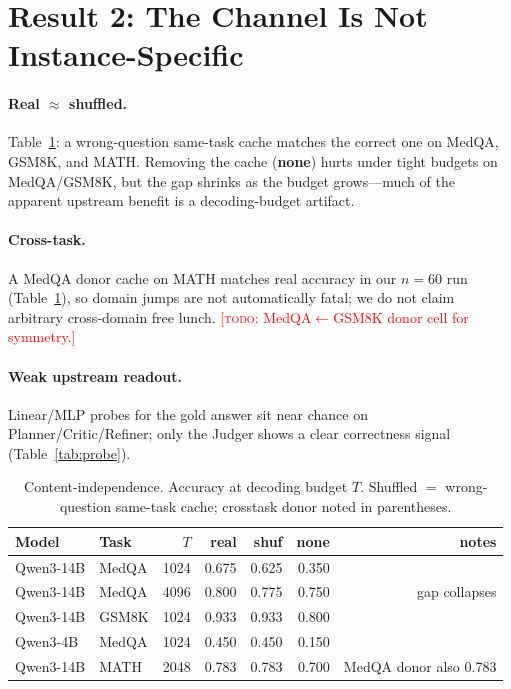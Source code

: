 \documentclass[11pt]{article}
\newcommand{\todo}[1]{\textcolor{red}{[\textsc{todo}: #1]}}
\newcommand{\approxeqq}{\ensuremath{\approx}}
\begin{document}
\section{Result 2: The Channel Is Not Instance-Specific}
\label{sec:mechanism}
\paragraph{Real $\approxeqq$ shuffled.} Table~\ref{tab:swap}: a wrong-question
same-task cache matches the correct one on MedQA, GSM8K, and MATH. Removing the
cache (\textbf{none}) hurts under tight budgets on MedQA/GSM8K, but the gap
shrinks as the budget grows---much of the apparent upstream benefit is a
decoding-budget artifact.

\paragraph{Cross-task.} A MedQA donor cache on MATH matches real accuracy in our
$n{=}60$ run (Table~\ref{tab:swap}), so domain jumps are not automatically fatal;
we do not claim arbitrary cross-domain free lunch. \todo{MedQA$\leftarrow$GSM8K
donor cell for symmetry.}

\paragraph{Weak upstream readout.} Linear/MLP probes for the gold answer sit near
chance on Planner/Critic/Refiner; only the Judger shows a clear correctness
signal (Table~\ref{tab:probe}).

\begin{table}[t]
\centering\small
\caption{Content-independence. Accuracy at decoding budget $T$. Shuffled $=$
wrong-question same-task cache; crosstask donor noted in parentheses.}
\label{tab:swap}
\begin{tabular}{@{}llrrrrr@{}}
\toprule
Model & Task & $T$ & real & shuf & none & notes \\
\midrule
Qwen3-14B & MedQA & 1024 & 0.675 & 0.625 & 0.350 & \\
Qwen3-14B & MedQA & 4096 & 0.800 & 0.775 & 0.750 & gap collapses \\
Qwen3-14B & GSM8K & 1024 & 0.933 & 0.933 & 0.800 & \\
Qwen3-4B  & MedQA & 1024 & 0.450 & 0.450 & 0.150 & \\
Qwen3-14B & MATH  & 2048 & 0.783 & 0.783 & 0.700 & MedQA donor also 0.783 \\
\bottomrule
\end{tabular}
\end{table}
\end{document}
